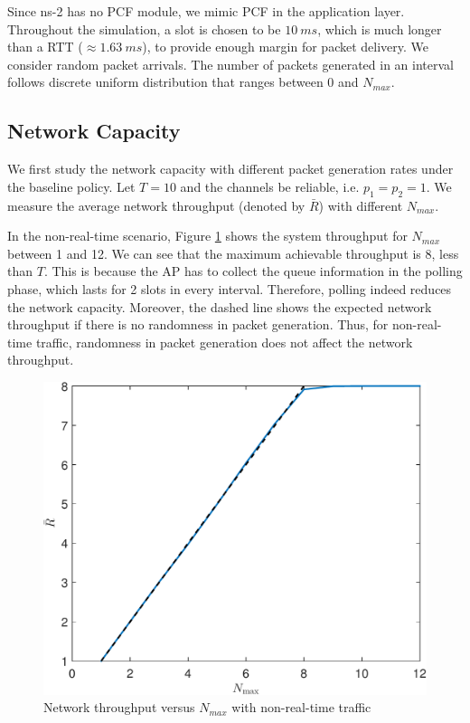 \documentclass{article}
\begin{document}
Since ns-2 has no PCF module, we mimic PCF in the application layer. Throughout the simulation, a slot is chosen to be $\SI{10}{ms}$, which is much longer than a RTT ($\approx\SI{1.63}{ms}$), to provide enough margin for packet delivery. We consider random packet arrivals. The number of packets generated in an interval follows discrete uniform distribution that ranges between 0 and $N_{max}$. 


\label{section: simulation}
\subsection{Network Capacity}
We first study the network capacity with different packet generation rates under the baseline policy. Let $T=10$ and the channels be reliable, i.e. $p_1 = p_2 = 1$. We measure the average network throughput (denoted by $\bar{R}$) with different $N_{max}$.

In the non-real-time scenario, Figure \ref{nonrealtime_throughput_randmax} shows the system throughput for $N_{max}$ between 1 and 12. We can see that the maximum achievable throughput is 8, less than $T$. This is because the AP has to collect the queue information in the polling phase, which lasts for 2 slots in every interval. Therefore, polling indeed reduces the network capacity. Moreover, the dashed line shows the expected network throughput if there is no randomness in packet generation. Thus, for non-real-time traffic, randomness in packet generation does not affect the network throughput.
\begin{figure}[htbp]
\centering
\includegraphics[scale=0.5]{nonrealtime_throughput_randmax.pdf}
\caption{Network throughput versus $N_{max}$ with non-real-time traffic}
\label{nonrealtime_throughput_randmax}
\end{figure}
\end{document}
